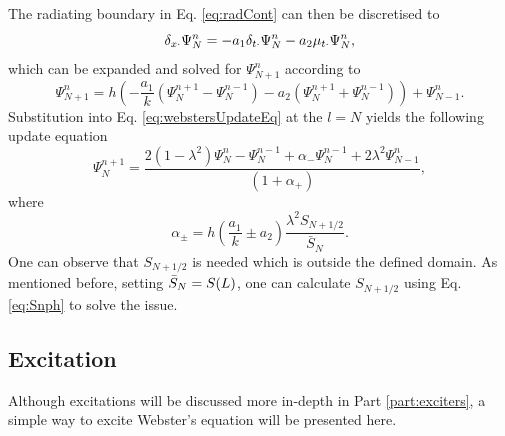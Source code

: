 The radiating boundary in Eq. \eqref{eq:radCont} can then be discretised to \cite{theBible}
\begin{equation}\label{eq:centRadBound}
    \delta_{x\cdot}\Psi_N^n = -a_1\delta_{t\cdot}\Psi_N^n - a_2\mu_{t\cdot}\Psi_N^n,
\end{equation}
which can be expanded and solved for $\Psi_{N+1}^n$ according to
\begin{equation}
    \Psi_{N+1}^n = h\left(-\frac{a_1}{k}(\Psi_N^{n+1} - \Psi_N^{n-1}) - a_2(\Psi_N^{n+1} + \Psi_N^{n-1})\right) + \Psi_{N-1}^n.
\end{equation}
Substitution into Eq. \eqref{eq:webstersUpdateEq} at the $l=N$ yields the following update equation
\begin{equation}
    \Psi_N^{n+1} = \frac{2(1-\lambda^2)\Psi_N^n-\Psi_N^{n-1}+\alpha_-\Psi_N^{n-1} + 2\lambda^2\Psi_{N-1}^n}{\left(1+\alpha_+\right)},
\end{equation}
where
\begin{equation}
    \alpha_\pm = h\left(\frac{a_1}{k}\pm a_2\right)\frac{\lambda^2S_{N+1/2}}{\bar S_N}.
\end{equation}
One can observe that $S_{N+1/2}$ is needed which is outside the defined domain. As mentioned before, setting $\bar{S}_N = S(L)$, one can calculate $S_{N+1/2}$ using Eq. \eqref{eq:Snph} to solve the issue. 

\subsection{Excitation}\label{eq:webstersExcitation}
Although excitations will be discussed more in-depth in Part \ref{part:exciters}, a simple way to excite Webster's equation will be presented here.


